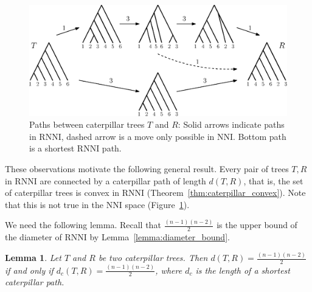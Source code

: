 \documentclass{amsart}
\newcommand{\nni}{\mathrm{NNI}}
\newcommand{\rnni}{\mathrm{RNNI}}
\newtheorem{lemma}[definition]{Lemma}
\begin{document}
\begin{figure}[H]
\centering
\includegraphics[width=\textwidth]{NNI_vs_RNNI}
\vspace{12pt}
\caption{Paths between caterpillar trees $T$ and $R$: Solid arrows indicate paths in $\rnni$, dashed arrow is a move only possible in $\nni$.
Bottom path is a shortest $\rnni$ path.}
\label{fig:NNI_vs_RNNI}
\end{figure}

These observations motivate the following general result.
Every pair of trees $T, R$ in $\rnni$ are connected by a caterpillar path of length $d(T,R)$, that is, the set of caterpillar trees is convex in $\rnni$ (Theorem~\ref{thm:caterpillar_convex}).
Note that this is not true in the $\nni$ space (Figure~\ref{fig:NNI_vs_RNNI}).

We need the following lemma.
Recall that $\frac{(n-1)(n-2)}{2}$ is the upper bound of the diameter of $\rnni$ by Lemma~\ref{lemma:diameter_bound}.

\begin{lemma}
Let $T$ and $R$ be two caterpillar trees.
Then $d(T,R) = \frac{(n-1)(n-2)}{2}$ if and only if $d_c(T,R) = \frac{(n-1)(n-2)}{2}$, where $d_c$ is the length of a shortest caterpillar path.
\label{lemma:caterpillar_dist=diameter}
\end{lemma}
\end{document}
